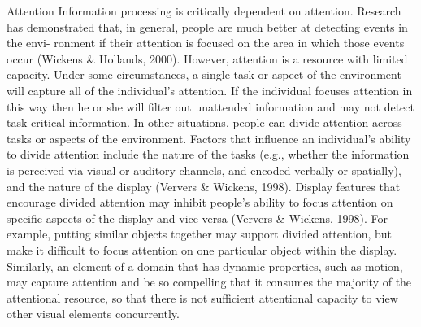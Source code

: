\documentclass[utf8,bachelor,manualbib]{gradu3}
\begin{document}
Attention
Information processing is critically dependent on attention. Research has demonstrated
that, in general, people are much better at detecting events in the envi-
ronment if their attention is focused on the area in which those events occur
(Wickens \& Hollands, 2000). However, attention is a resource with limited capacity.
Under some circumstances, a single task or aspect of the environment
will capture all of the individual’s attention. If the individual focuses attention in
this way then he or she will filter out unattended information and may not detect
task-critical information. In other situations, people can divide attention across
tasks or aspects of the environment. Factors that influence an individual’s ability
to divide attention include the nature of the tasks (e.g., whether the information
is perceived via visual or auditory channels, and encoded verbally or spatially),
and the nature of the display (Ververs \& Wickens, 1998).
Display features that encourage divided attention may inhibit people’s ability to
focus attention on specific aspects of the display and vice versa (Ververs \&
Wickens, 1998). For example, putting similar objects together may support divided
attention, but make it difficult to focus attention on one particular object
within the display. Similarly, an element of a domain that has dynamic properties,
such as motion, may capture attention and be so compelling that it consumes the
majority of the attentional resource, so that there is not sufficient attentional capacity
to view other visual elements concurrently. \citep{crawford2006}
\end{document}
